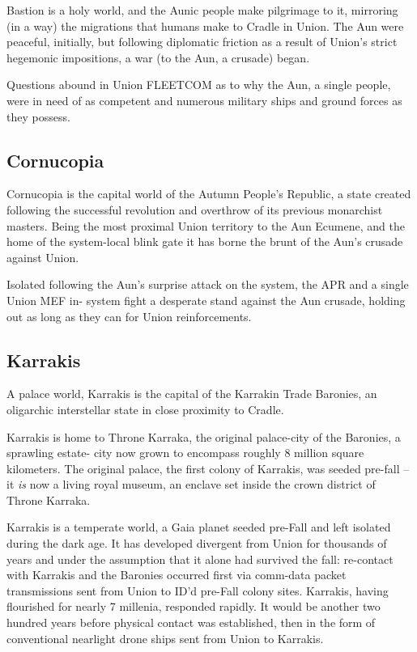 Bastion is a holy world, and the Aunic people make pilgrimage to it, mirroring (in a way) the
migrations that humans make to Cradle in Union. The Aun were peaceful, initially, but following
diplomatic friction as a result of Union's strict hegemonic impositions, a war (to the Aun, a
crusade) began.

Questions abound in Union FLEETCOM as to why the Aun, a single people, were in need of as
competent and numerous military ships and ground forces as they possess.

\subsection{Cornucopia}

Cornucopia is the capital world of the Autumn People's Republic, a state created following the
successful revolution and overthrow of its previous monarchist masters. Being the most proximal
Union territory to the Aun Ecumene, and the home of the system-local blink gate it has borne the
brunt of the Aun's crusade against Union.

Isolated following the Aun's surprise attack on the system, the APR and a single Union MEF in-
system fight a desperate stand against the Aun crusade, holding out as long as they can for
Union reinforcements.

\subsection{Karrakis}

A palace world, Karrakis is the capital of the Karrakin Trade Baronies, an oligarchic interstellar
state in close proximity to Cradle.

Karrakis is home to Throne Karraka, the original palace-city of the Baronies, a sprawling estate-
city now grown to encompass roughly 8 million square kilometers. The original palace, the first
colony of Karrakis, was seeded pre-fall -- it \textit{is} now a living royal museum, an enclave set inside
the crown district of Throne Karraka.

Karrakis is a temperate world, a Gaia planet seeded pre-Fall and left isolated during the dark age.
It has developed divergent from Union for thousands of years and under the assumption that it
alone had survived the fall: re-contact with Karrakis and the Baronies occurred first via comm-data
packet transmissions sent from Union to ID'd pre-Fall colony sites. Karrakis, having flourished for
nearly 7 millenia, responded rapidly. It would be another two hundred years before physical
contact was established, then in the form of conventional nearlight drone ships sent from Union to
Karrakis.

